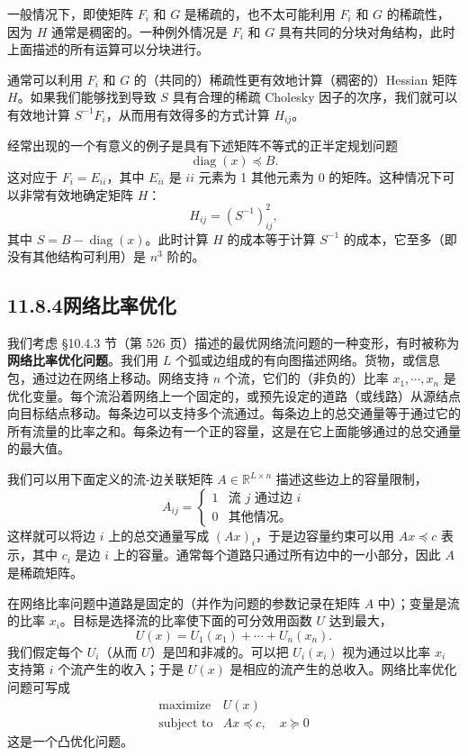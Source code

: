 \documentclass[UTF8, 12pt, fontset=fandol, oneside]{ctexart}
\begin{document}
一般情况下，即使矩阵 $F_i$ 和 $G$ 是稀疏的，也不太可能利用 $F_i$ 和 $G$ 的稀疏性，因为 $H$ 通常是稠密的。一种例外情况是 $F_i$ 和 $G$ 具有共同的分块对角结构，此时上面描述的所有运算可以分块进行。

通常可以利用 $F_i$ 和 $G$ 的（共同的）稀疏性更有效地计算（稠密的）Hessian 矩阵 $H$。如果我们能够找到导致 $S$ 具有合理的稀疏 Cholesky 因子的次序，我们就可以有效地计算 $S^{-1}F_i$，从而用有效得多的方式计算 $H_{ij}$。

经常出现的一个有意义的例子是具有下述矩阵不等式的正半定规划问题
\[
\operatorname{diag}(x)\preceq B.
\]
这对应于 $F_i=E_{ii}$，其中 $E_{ii}$ 是 $ii$ 元素为 1 其他元素为 0 的矩阵。这种情况下可以非常有效地确定矩阵 $H$：
\[
H_{ij}=(S^{-1})_{ij}^2,
\]
其中 $S=B-\operatorname{diag}(x)$。此时计算 $H$ 的成本等于计算 $S^{-1}$ 的成本，它至多（即没有其他结构可利用）是 $n^3$ 阶的。

\subsection*{11.8.4\quad 网络比率优化}

我们考虑 \S 10.4.3 节（第 526 页）描述的最优网络流问题的一种变形，有时被称为\textbf{网络比率优化问题}。我们用 $L$ 个弧或边组成的有向图描述网络。货物，或信息包，通过边在网络上移动。网络支持 $n$ 个流，它们的（非负的）比率 $x_1,\cdots,x_n$ 是优化变量。每个流沿着网络上一个固定的，或预先设定的道路（或线路）从源结点向目标结点移动。每条边可以支持多个流通过。每条边上的总交通量等于通过它的所有流量的比率之和。每条边有一个正的容量，这是在它上面能够通过的总交通量的最大值。

我们可以用下面定义的流-边关联矩阵 $A\in\mathbb{R}^{L\times n}$ 描述这些边上的容量限制，
\[
A_{ij}=
\begin{cases}
1 & \text{流 }j\text{ 通过边 }i\\
0 & \text{其他情况。}
\end{cases}
\]
这样就可以将边 $i$ 上的总交通量写成 $(Ax)_i$，于是边容量约束可以用 $Ax\preceq c$ 表示，其中 $c_i$ 是边 $i$ 上的容量。通常每个道路只通过所有边中的一小部分，因此 $A$ 是稀疏矩阵。

在网络比率问题中道路是固定的（并作为问题的参数记录在矩阵 $A$ 中）；变量是流的比率 $x_i$。目标是选择流的比率使下面的可分效用函数 $U$ 达到最大，
\[
U(x)=U_1(x_1)+\cdots+U_n(x_n).
\]
我们假定每个 $U_i$（从而 $U$）是凹和非减的。可以把 $U_i(x_i)$ 视为通过以比率 $x_i$ 支持第 $i$ 个流产生的收入；于是 $U(x)$ 是相应的流产生的总收入。网络比率优化问题可写成
\begin{equation}
\begin{array}{ll}
\text{maximize} & U(x)\\
\text{subject to} & Ax\preceq c,\quad x\succeq 0
\end{array}
\tag{11.62}
\end{equation}
这是一个凸优化问题。
\end{document}
